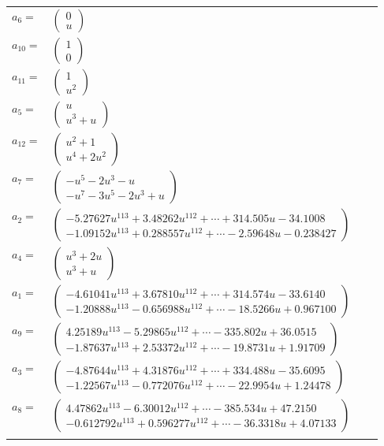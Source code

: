 \documentclass[1p]{elsarticle_modified}
\theoremstyle{definition}
\begin{document}
\begin{tabular}{m{7pt} m{180pt} m{7pt} m{180pt} }
\flushright $a_{6}=$&$\begin{pmatrix}0\\u\end{pmatrix}$ \\
\flushright $a_{10}=$&$\begin{pmatrix}1\\0\end{pmatrix}$ \\
\flushright $a_{11}=$&$\begin{pmatrix}1\\u^2\end{pmatrix}$ \\
\flushright $a_{5}=$&$\begin{pmatrix}u\\u^3+u\end{pmatrix}$ \\
\flushright $a_{12}=$&$\begin{pmatrix}u^2+1\\u^4+2 u^2\end{pmatrix}$ \\
\flushright $a_{7}=$&$\begin{pmatrix}- u^5-2 u^3- u\\- u^7-3 u^5-2 u^3+u\end{pmatrix}$ \\
\flushright $a_{2}=$&$\begin{pmatrix}-5.27627 u^{113}+3.48262 u^{112}+\cdots+314.505 u-34.1008\\-1.09152 u^{113}+0.288557 u^{112}+\cdots-2.59648 u-0.238427\end{pmatrix}$ \\
\flushright $a_{4}=$&$\begin{pmatrix}u^3+2 u\\u^3+u\end{pmatrix}$ \\
\flushright $a_{1}=$&$\begin{pmatrix}-4.61041 u^{113}+3.67810 u^{112}+\cdots+314.574 u-33.6140\\-1.20888 u^{113}-0.656988 u^{112}+\cdots-18.5266 u+0.967100\end{pmatrix}$ \\
\flushright $a_{9}=$&$\begin{pmatrix}4.25189 u^{113}-5.29865 u^{112}+\cdots-335.802 u+36.0515\\-1.87637 u^{113}+2.53372 u^{112}+\cdots-19.8731 u+1.91709\end{pmatrix}$ \\
\flushright $a_{3}=$&$\begin{pmatrix}-4.87644 u^{113}+4.31876 u^{112}+\cdots+334.488 u-35.6095\\-1.22567 u^{113}-0.772076 u^{112}+\cdots-22.9954 u+1.24478\end{pmatrix}$ \\
\flushright $a_{8}=$&$\begin{pmatrix}4.47862 u^{113}-6.30012 u^{112}+\cdots-385.534 u+47.2150\\-0.612792 u^{113}+0.596277 u^{112}+\cdots-36.3318 u+4.07133\end{pmatrix}$\\&\end{tabular}
\end{document}
